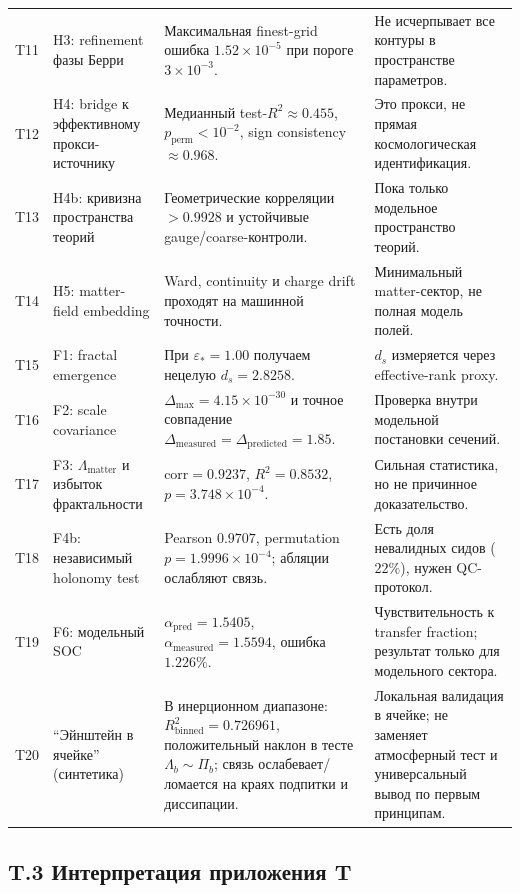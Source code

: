 \documentclass[11pt,a4paper]{article}
\theoremstyle{definition}
\theoremstyle{plain}
\theoremstyle{remark}
\begin{document}
{\begin{longtable}{@{}p{1.1cm}p{3.2cm}p{5.1cm}p{3.8cm}@{}}
T11 & H3: refinement фазы Берри & Максимальная finest-grid ошибка $1.52\times10^{-5}$ при пороге $3\times10^{-3}$. & Не исчерпывает все контуры в пространстве параметров. \\
T12 & H4: bridge к эффективному прокси-источнику & Медианный test-$R^2\approx0.455$, $p_{\mathrm{perm}}<10^{-2}$, sign consistency $\approx0.968$. & Это прокси, не прямая космологическая идентификация. \\
T13 & H4b: кривизна пространства теорий & Геометрические корреляции $>0.9928$ и устойчивые gauge/coarse-контроли. & Пока только модельное пространство теорий. \\
T14 & H5: matter-field embedding & Ward, continuity и charge drift проходят на машинной точности. & Минимальный matter-сектор, не полная модель полей. \\
T15 & F1: fractal emergence & При $\varepsilon_\ast=1.00$ получаем нецелую $d_s=2.8258$. & $d_s$ измеряется через effective-rank proxy. \\
T16 & F2: scale covariance & $\Delta_{\max}=4.15\times10^{-30}$ и точное совпадение $\Delta_{\mathrm{measured}}=\Delta_{\mathrm{predicted}}=1.85$. & Проверка внутри модельной постановки сечений. \\
T17 & F3: $\Lambda_{\mathrm{matter}}$ и избыток фрактальности & $\mathrm{corr}=0.9237$, $R^2=0.8532$, $p=3.748\times10^{-4}$. & Сильная статистика, но не причинное доказательство. \\
T18 & F4b: независимый holonomy test & Pearson $0.9707$, permutation $p=1.9996\times10^{-4}$; абляции ослабляют связь. & Есть доля невалидных сидов ($22\%$), нужен QC-протокол. \\
T19 & F6: модельный SOC & $\alpha_{\mathrm{pred}}=1.5405$, $\alpha_{\mathrm{measured}}=1.5594$, ошибка $1.226\%$. & Чувствительность к transfer fraction; результат только для модельного сектора. \\
T20 & ``Эйнштейн в ячейке'' (синтетика) & В инерционном диапазоне: $R^2_{\mathrm{binned}}=0.726961$, положительный наклон в тесте $\Lambda_b\sim\Pi_b$; связь ослабевает/ломается на краях подпитки и диссипации. & Локальная валидация в ячейке; не заменяет атмосферный тест и универсальный вывод по первым принципам. \\
\bottomrule
\end{longtable}
}

\subsection*{T.3 Интерпретация приложения T}
\end{document}
